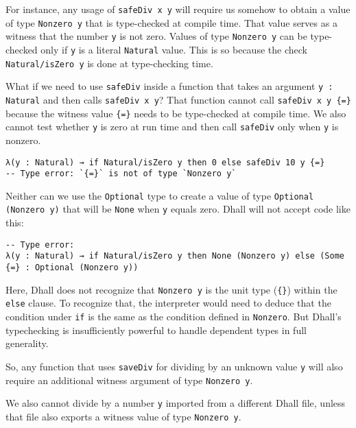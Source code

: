 For instance, any usage of \lstinline!safeDiv x y! will require us somehow to obtain a value of type \lstinline!Nonzero y! that is type-checked at compile time.
That value serves as a witness that the number \lstinline!y! is not zero.
Values of type \lstinline!Nonzero y! can be type-checked only if \lstinline!y! is a literal \lstinline!Natural! value.
This is so because the check \lstinline!Natural/isZero y! is done at type-checking time.


What if we need to use \lstinline!safeDiv! inside a function that takes an argument \lstinline!y : Natural! and then calls \lstinline!safeDiv x y!?
That function cannot call \lstinline!safeDiv x y {=}! because the witness value \lstinline!{=}! needs to be type-checked at compile time.
We also cannot test whether \lstinline!y! is zero at run time and then call \lstinline!safeDiv! only when \lstinline!y! is nonzero.


\begin{lstlisting}[language=Dhall]
λ(y : Natural) → if Natural/isZero y then 0 else safeDiv 10 y {=}
-- Type error: `{=}` is not of type `Nonzero y`
\end{lstlisting}


Neither can we use the \lstinline!Optional! type to create a value of type \lstinline!Optional (Nonzero y)! that will be \lstinline!None! when \lstinline!y! equals zero.
Dhall will not accept code like this:


\begin{lstlisting}[language=Dhall]
-- Type error:
λ(y : Natural) → if Natural/isZero y then None (Nonzero y) else (Some {=} : Optional (Nonzero y))
\end{lstlisting}


Here, Dhall does not recognize that \lstinline!Nonzero y! is the unit type (\lstinline!{}!) within the \lstinline!else! clause.
To recognize that, the interpreter would need to deduce that the condition under \lstinline!if! is the same as the condition defined in \lstinline!Nonzero!.
But Dhall's typechecking is insufficiently powerful to handle dependent types in full generality.


So, any function that uses \lstinline!saveDiv! for dividing by an unknown value \lstinline!y! will also require an additional witness argument of type \lstinline!Nonzero y!.


We also cannot divide by a number \lstinline!y! imported from a different Dhall file, unless that file also exports a witness value of type \lstinline!Nonzero y!.


